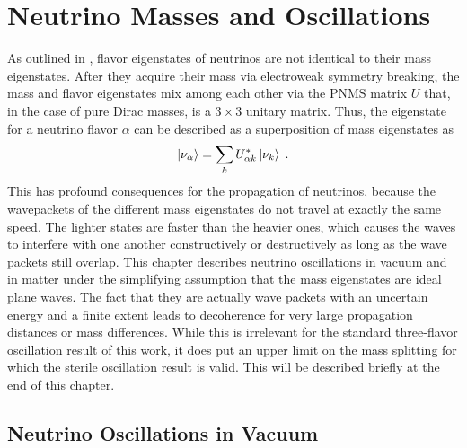 \setchapterpreamble[u]{\margintoc}
\chapter{Neutrino Masses and Oscillations}

As outlined in , flavor eigenstates of neutrinos are not identical to their mass eigenstates. After they acquire their mass via electroweak symmetry breaking, the mass and flavor eigenstates mix among each other via the PNMS matrix $U$ that, in the case of pure Dirac masses, is a $3\times3$ unitary matrix. Thus, the eigenstate for a neutrino flavor $\alpha$ can be described as a superposition of mass eigenstates as
\begin{equation}
    \ket{\nu_\alpha} = \sum_k U^*_{\alpha k}\ket{\nu_k}\;.\label{eq:flavor-state-def}
\end{equation}
This has profound consequences for the propagation of neutrinos, because the wavepackets of the different mass eigenstates do not travel at exactly the same speed. The lighter states are faster than the heavier ones, which causes the waves to interfere with one another constructively or destructively as long as the wave packets still overlap. This chapter describes neutrino oscillations in vacuum and in matter under the simplifying assumption that the mass eigenstates are ideal plane waves. The fact that they are actually wave packets with an uncertain energy and a finite extent leads to decoherence for very large propagation distances or mass differences. While this is irrelevant for the standard three-flavor oscillation result of this work, it does put an upper limit on the mass splitting for which the sterile oscillation result is valid. This will be described briefly at the end of this chapter.

\section{Neutrino Oscillations in Vacuum}

